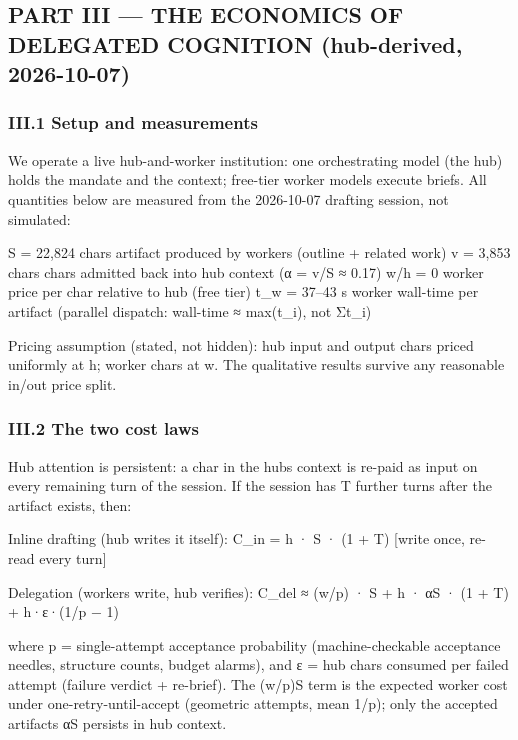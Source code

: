 \documentclass[
]{article}
\begin{document}
\subsection{PART III --- THE ECONOMICS OF DELEGATED COGNITION
(hub-derived,
2026-10-07)}\label{part-iii--the-economics-of-delegated-cognition-hub-derived-2026-10-07}

\subsubsection{III.1 Setup and
measurements}\label{iii1-setup-and-measurements}

We operate a live hub-and-worker institution: one orchestrating model
(the hub) holds the mandate and the context; free-tier worker models
execute briefs. All quantities below are measured from the 2026-10-07
drafting session, not simulated:

S = 22,824 chars artifact produced by workers (outline + related work) v
= 3,853 chars chars admitted back into hub context (α = v/S ≈ 0.17) w/h
= 0 worker price per char relative to hub (free tier) t\_w = 37--43 s
worker wall-time per artifact (parallel dispatch: wall-time ≈ max(t\_i),
not Σt\_i)

Pricing assumption (stated, not hidden): hub input and output chars
priced uniformly at h; worker chars at w. The qualitative results
survive any reasonable in/out price split.

\subsubsection{III.2 The two cost laws}\label{iii2-the-two-cost-laws}

Hub attention is persistent: a char in the hub\textquotesingle s context
is re-paid as input on every remaining turn of the session. If the
session has T further turns after the artifact exists, then:

Inline drafting (hub writes it itself): C\_in = h · S · (1 + T) {[}write
once, re-read every turn{]}

Delegation (workers write, hub verifies): C\_del ≈ (w/p) · S + h · αS ·
(1 + T) + h·ε·(1/p − 1)

where p = single-attempt acceptance probability (machine-checkable
acceptance needles, structure counts, budget alarms), and ε = hub chars
consumed per failed attempt (failure verdict + re-brief). The (w/p)S
term is the expected worker cost under one-retry-until-accept (geometric
attempts, mean 1/p); only the accepted artifact\textquotesingle s αS
persists in hub context.
\end{document}
